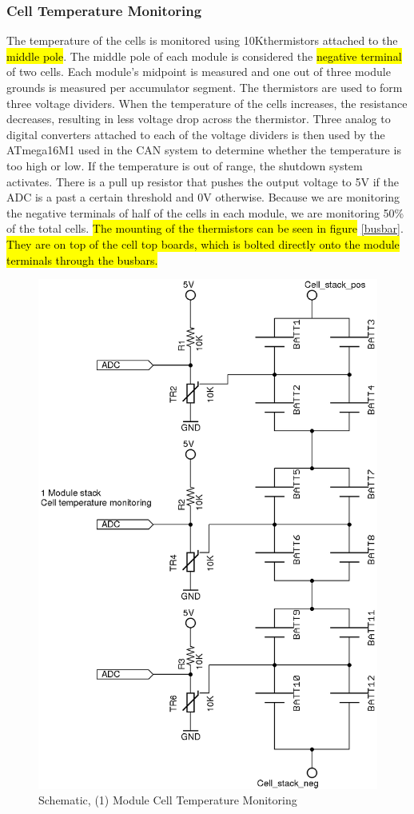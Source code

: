 \documentclass{article}
\DeclareRobustCommand{\hlr}[1]{{\sethlcolor{red}\hl{#1}}}
\begin{document}
        \subsubsection{Cell Temperature Monitoring} %


            The temperature of the cells is monitored using 10K\ohm thermistors attached to the \hlr{middle pole}. The middle pole of each module is considered the \hlr{negative terminal} of two cells. Each module’s midpoint is measured and one out of three module grounds is measured per accumulator segment. The thermistors are used to form three voltage dividers. When the temperature of the cells increases, the resistance decreases, resulting in less voltage drop across the thermistor. Three analog to digital converters attached to each of the voltage dividers is then used by the ATmega16M1 used in the CAN system to determine whether the temperature is too high or low. If the temperature is out of range, the shutdown system activates. There is a pull up resistor that pushes the output voltage to 5V if the ADC is a past a certain threshold and 0V otherwise. Because we are monitoring the negative terminals of half of the cells in each module, we are monitoring 50\% of the total cells.
            \hlr{The mounting of the thermistors can be seen in figure} \ref{busbar}. \hlr{They are on top of the cell top boards, which is bolted directly onto the module terminals through the busbars.}


            \begin{figure}[H]
                \centering
                \includegraphics[width = 0.4 \textwidth]{celltemp}
                \caption{Schematic, (1) Module Cell Temperature Monitoring}
                \label{celltemp}
            \end{figure}
\end{document}
